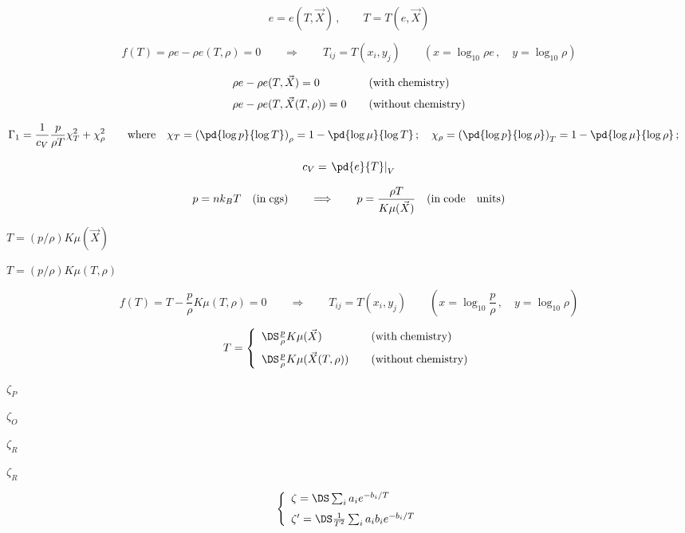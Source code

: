 \documentclass{article}
\begin{document}
\[     e = e(T,\vec{X})\,,\qquad
     T = T(e,\vec{X})
\]
\pagebreak

\[  f(T) = \rho e - \rho e(T,\rho) = 0
  \qquad\Longrightarrow\qquad
  T_{ij} = T(x_i, y_j) \qquad
  \left(x=\log_{10}\rho e\,,\quad y=\log_{10}\rho\right)
\]
\pagebreak

\[   \begin{array}{ll}
    \rho e - \rho e(T,\vec{X}) = 0  & \quad{(\rm with\; chemistry)}
          \\ \noalign{\medskip}
    \rho e - \rho e(T,\vec{X}(T,\rho)) = 0 & \quad{(\rm without\; chemistry)}
       \end{array}
\]
\pagebreak

\[    \Gamma_1 = \frac{1}{c_V}\frac{p}{\rho T} \chi_T^2 + \chi_\rho^2
    \qquad{\rm where}\quad
    \chi_T = \left(\pd{\log p}{\log T}\right)_{\rho} = 
             1 - \pd{\log{\mu}}{\log T} \,;\quad
    \chi_\rho = \left(\pd{\log p}{\log\rho}\right)_{T} = 
                 1 - \pd{\log{\mu}}{\log\rho} \,;\quad
\]
\pagebreak

\[     c_V = \left.\pd{e}{T}\right|_V
\]
\pagebreak

\[     p = nk_BT \quad {\rm(in\; cgs)} 
     \qquad \Longrightarrow\qquad
     p = \frac{\rho T}{K\mu(\vec{X})} \quad {\rm(in\; code\quad units)} 
\]
\pagebreak

$ T=(p/\rho) K\mu(\vec{X})$
\pagebreak

$T = (p/\rho) K \mu(T,\rho)$
\pagebreak

\[  f(T) = T - \frac{p}{\rho} K\mu(T,\rho) = 0
  \qquad\Longrightarrow\qquad
  T_{ij} = T(x_i, y_j) \qquad
  \left(x=\log_{10}\frac{p}{\rho}\,,\quad y=\log_{10}\rho\right)
\]
\pagebreak

\[   T = \left\{\begin{array}{ll}
       \DS \frac{p}{\rho} K \mu(\vec{X}) &\quad{(\rm with\; chemistry)}
          \\ \noalign{\medskip}
       \DS \frac{p}{\rho}K\mu(\vec{X}(T,\rho)) & \quad{(\rm without\; chemistry)}
       \end{array}\right.
\]
\pagebreak

$ \zeta_P$
\pagebreak

$ \zeta_O$
\pagebreak

$\zeta_R$
\pagebreak

$ \zeta_R$
\pagebreak

\[  \left\{\begin{array}{l}
    \zeta  = \DS \sum_i a_ie^{-b_i/T} \\ \noalign{\medskip}
    \zeta' = \DS \frac{1}{T^2}\sum_i a_ib_ie^{-b_i/T} 
  \end{array}\right.
\]
\pagebreak
\end{document}

